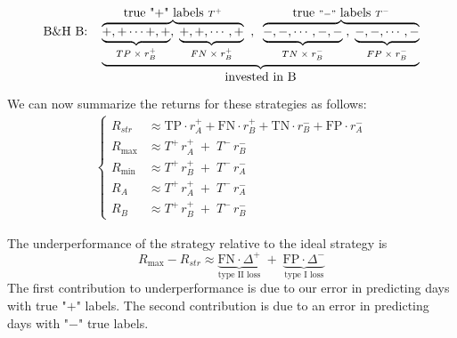 \documentclass{article}
\begin{document}
\begin{itemize}[nosep]
\begin{equation*}
   \hbox{B{\&}H B:}  \quad \underbrace{
   \overbrace{\underbrace{ +,+\cdots +,+}_{TP\;\times\; r_{B}^{+}} , 
    \;\underbrace{+,+,\cdots, + }_{FN\; \times \; r_{B}^{+}}}^{\hbox{true "+" labels }T^{+}}
    \;\; , \;\; 
\overbrace{\underbrace{-,-,\cdots  ,-,-}_{TN\; \times \; r_{B}^{-}}\; , \; 
\underbrace{ -,-,\cdots ,-}_{FP\; \times\; r_{B}^{-}}}^{\hbox{true }"-"
\hbox{ labels } T^{-}} }_{\hbox{invested in B}}
\end{equation*}
\begin{comment}
The return of this strategy is
\begin{equation}
    R^{B} \approx T^{+}r_{B}^{+} + T^{-}r_{B}^{-}=(\text{TP} + \text{FN}) \, r_{B}^{+}  +
    (\text{TN} + \text{FP})\,  r_{B}^{-} 
    \label{buy_hold_strategy_return_B}
\end{equation}
\end{comment}
\end{itemize}
We can now summarize the returns for these strategies as follows:
\begin{equation}
\begin{split}
\begin{cases}
    R_{str} & \approx \text{TP}\cdot r_{A}^{+} + \text{FN}\cdot r_{B}^{+} + \text{TN}\cdot r_{B}^{-} +
    \text{FP}\cdot r_{A}^{-} \\
      R_{\max} & \approx  T^{+}\, r_{A}^{+} \; + \; T^{-}\, r_{B}^{-} \\
    R_{\min} & \approx  T^{+}\,r_{B}^{+} \; + \; T^{-}\,r_{A}^{-} \\
        R_{A} &  \approx  T^{+}\,r_{A}^{+}\; +\;  T^{-}\,r_{A}^{-} \\
        R_{B} &  \approx  T^{+}\,r_{B}^{+} \; + \; T^{-}\,r_{B}^{-}
    \end{cases}
\end{split}
\label{return_all_strategies}
\end{equation}

The underperformance of the strategy relative to the ideal strategy is
\begin{equation}
R_{\max}-R_{str}\approx\underbrace{\text{FN} \cdot \Delta^{+}}_{\text{type II loss}}
\; + \; \underbrace{\text{FP} \cdot \Delta^{-}}_{\text{type I loss}}
\end{equation}
The first contribution to underperformance is due to our error in predicting days with true 
"$+$" labels. The second contribution is due to an error in predicting days with "$-$" true labels.
\end{document}
